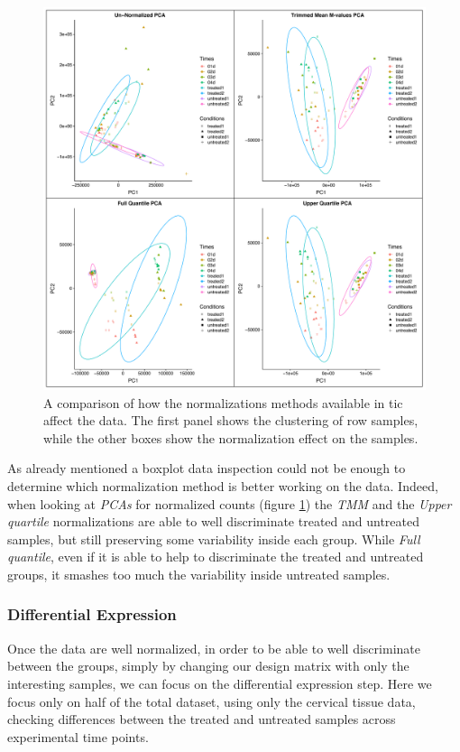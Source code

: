 \begin{figure}[H]
\includegraphics[width=12cm,keepaspectratio]{img/ticorser/normalizing/pca/all_pca.pdf}
\caption[ticorser normalizing \gls{pca}]{A comparison of how the normalizations methods available in \gls{tic} affect the data.
The first panel shows the clustering of row samples, while the other boxes show the normalization effect on the samples.}
\label{fig:ticorsernormalizingpca}
\centering
\end{figure}

As already mentioned a boxplot data inspection could not be enough to determine which normalization method is better working on the data. 
Indeed, when looking at \textit{PCAs} for normalized counts (figure \ref{fig:ticorsernormalizingpca}) the \textit{TMM} and the \textit{Upper quartile} normalizations are able to well discriminate treated and untreated samples, but still preserving some variability inside each group.
While \textit{Full quantile}, even if it is able to help to discriminate the treated and untreated groups, it smashes too much the variability inside untreated samples.

\subsubsection{Differential Expression}
Once the data are well normalized, in order to be able to well discriminate between the groups, simply by changing our design matrix with only the interesting samples, we can focus on the differential expression step.
Here we focus only on half of the total dataset, using only the cervical tissue data, checking differences between the treated and untreated samples across experimental time points.

